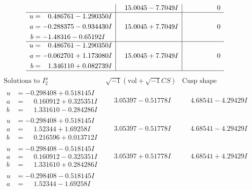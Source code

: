 \documentclass[1p]{elsarticle_modified}
\theoremstyle{definition}
\newcommand{\I}{\sqrt{-1}}
\begin{document}
$$\begin{array}{c|c|c}
 & \phantom{-}15.0045 - 7.7049 I & \phantom{-0.000000 } 0 \\ \hline\begin{aligned}
u &= \phantom{-}0.486761 - 1.290350 I \\
a &= -0.288375 - 0.934430 I \\
b &= -1.48316 - 0.65192 I\end{aligned}
 & \phantom{-}15.0045 + 7.7049 I & \phantom{-0.000000 } 0 \\ \hline\begin{aligned}
u &= \phantom{-}0.486761 - 1.290350 I \\
a &= -0.062701 + 1.173080 I \\
b &= \phantom{-}1.346110 + 0.082739 I\end{aligned}
 & \phantom{-}15.0045 + 7.7049 I & \phantom{-0.000000 } 0\\
 \hline 
 \end{array}$$\newpage$$\begin{array}{c|c|c}  
\text{Solutions to }I^u_{2}& \I (\text{vol} + \sqrt{-1}CS) & \text{Cusp shape}\\
 \hline 
\begin{aligned}
u &= -0.298408 + 0.518145 I \\
a &= \phantom{-}0.160912 + 0.325351 I \\
b &= \phantom{-}1.331610 - 0.284286 I\end{aligned}
 & \phantom{-}3.05397 - 0.51778 I & \phantom{-}4.68541 - 4.29429 I \\ \hline\begin{aligned}
u &= -0.298408 + 0.518145 I \\
a &= \phantom{-}1.52344 + 1.69258 I \\
b &= \phantom{-}0.216596 + 0.013712 I\end{aligned}
 & \phantom{-}3.05397 - 0.51778 I & \phantom{-}4.68541 - 4.29429 I \\ \hline\begin{aligned}
u &= -0.298408 - 0.518145 I \\
a &= \phantom{-}0.160912 - 0.325351 I \\
b &= \phantom{-}1.331610 + 0.284286 I\end{aligned}
 & \phantom{-}3.05397 + 0.51778 I & \phantom{-}4.68541 + 4.29429 I \\ \hline\begin{aligned}
u &= -0.298408 - 0.518145 I \\
a &= \phantom{-}1.52344 - 1.69258 I \\

\end{aligned}
\end{array}$$
\end{document}
